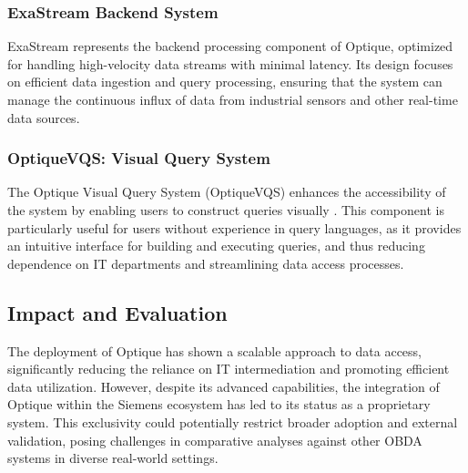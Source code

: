 \subsubsection{ExaStream Backend System}
ExaStream represents the backend processing component of Optique, optimized for handling high-velocity data streams with minimal latency. Its design focuses on efficient data ingestion and query processing, ensuring that the system can manage the continuous influx of data from industrial sensors and other real-time data sources.
\subsubsection{OptiqueVQS: Visual Query System}
The Optique Visual Query System (OptiqueVQS) enhances the accessibility of the system by enabling users to construct queries visually \cite{DBLP:journals/semweb/SoyluKZJGSHSBLH18}. This component is particularly useful for users without experience in query languages, as it provides an intuitive interface for building and executing queries, and thus reducing dependence on IT departments and streamlining data access processes.
\subsection{Impact and Evaluation}
The deployment of Optique has shown a scalable approach to data access, significantly reducing the reliance on IT intermediation and promoting efficient data utilization. 
However, despite its advanced capabilities, the integration of Optique within the Siemens ecosystem has led to its status as a proprietary system. This exclusivity could potentially restrict broader adoption and external validation, posing challenges in comparative analyses against other OBDA systems in diverse real-world settings.